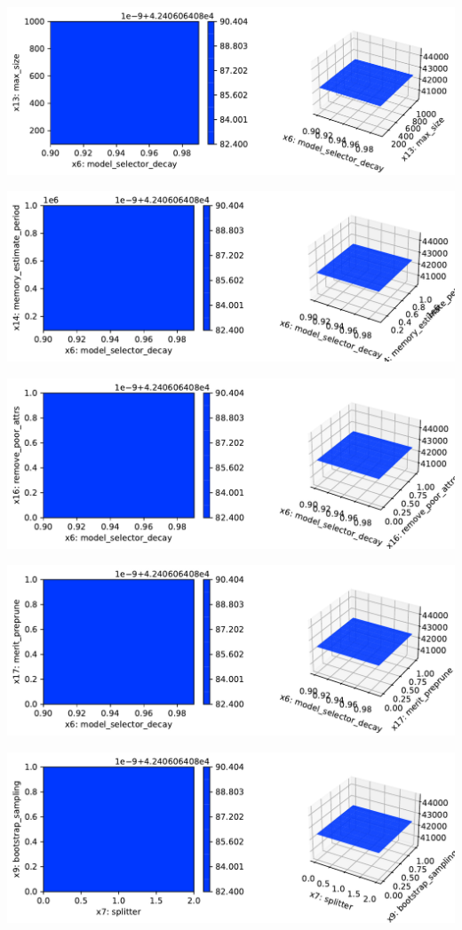 \documentclass[
  letterpaper,
  DIV=11,
  numbers=noendperiod]{scrreprt}
\begin{document}
\includegraphics{024_spot_hpt_river_friedman_hatr_files/figure-pdf/cell-42-output-75.pdf}

\includegraphics{024_spot_hpt_river_friedman_hatr_files/figure-pdf/cell-42-output-76.pdf}

\includegraphics{024_spot_hpt_river_friedman_hatr_files/figure-pdf/cell-42-output-77.pdf}

\includegraphics{024_spot_hpt_river_friedman_hatr_files/figure-pdf/cell-42-output-78.pdf}

\includegraphics{024_spot_hpt_river_friedman_hatr_files/figure-pdf/cell-42-output-79.pdf}
\end{document}
